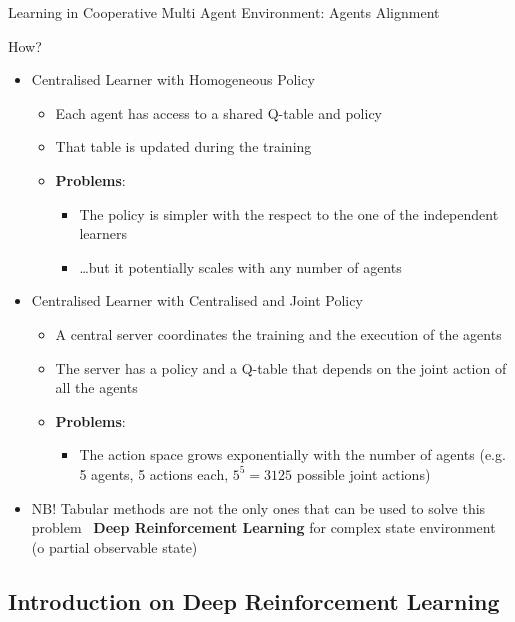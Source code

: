 \documentclass[presentation, 8pt]{beamer}\mode<presentation>{\usetheme{AMSBolognaFC}}
\begin{document}
\begin{frame}[allowframebreaks]{Learning in Cooperative Multi Agent Environment: Agents Alignment}
\begin{alertblock}{How?}
\begin{itemize}
\begin{itemize}
\begin{itemize}
				\item It hardly scales with the number of agent
			\end{itemize}
		\end{itemize}
		\item Centralised Learner with Homogeneous Policy
		\begin{itemize}
			\item Each agent has access to a shared Q-table and policy
			\item That table is updated during the training
			\item \textbf{Problems}:
			\begin{itemize}
				\item The policy is simpler with the respect to the one of the independent learners
				\item \dots but it potentially scales with any number of agents
			\end{itemize}
		\end{itemize}
		\item Centralised Learner with Centralised and Joint Policy
		\begin{itemize}
			\item A central server coordinates the training and the execution of the agents
			\item The server has a policy and a Q-table that depends on the joint action of all the agents
			\item \textbf{Problems}:
			\begin{itemize}
				\item The action space grows exponentially with the number of agents (e.g. 5 agents, 5 actions each, $5^5=3125$ possible joint actions)
			\end{itemize}
		\end{itemize}
		\item NB! Tabular methods are not the only ones that can be used to solve this problem \faArrowRight \, \textbf{Deep Reinforcement Learning} for complex state environment (o partial observable state)
	\end{itemize}
\end{alertblock}
\end{frame}
\subsection{Introduction on Deep Reinforcement Learning}
\end{document}
